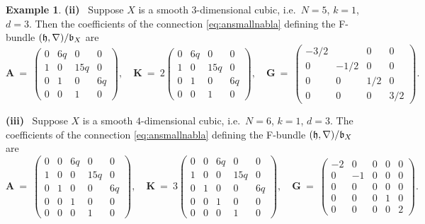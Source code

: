 \documentclass[twoside,leqno]{article}
\numberwithin{equation}{section}
\theoremstyle{plain}
\theoremstyle{definition}
\newtheorem{example}[equation]{Example}
\begin{document}
\begin{example}
\medskip

\noindent
{\bfseries (ii)} \  Suppose $X$ is a smooth  $3$-dimensional cubic, i.e.\ $N=5$, $k=1$, $d = 3$. Then the coefficients of the connection \eqref{eq:ansmallnabla} defining the F-bundle $(\mathfrak{h},\nabla)/\mathfrak{b}_{X}$ are
{\scriptsize
\[ 
\mathbf{A} \ = \  \begin{pmatrix}
0 & 6q & 0 & 0 \\
1 & 0 & 15q & 0 \\
0 & 1 & 0 & 6q \\
0 & 0 & 1 & 0
\end{pmatrix}, \quad 
\mathbf{K} \ = \  2\begin{pmatrix}
0 & 6q & 0 & 0 \\
1 & 0 & 15q & 0 \\
0 & 1 & 0 & 6q \\
0 & 0 & 1 & 0
\end{pmatrix}, \quad 
\mathbf{G} \ = \  \begin{pmatrix}
-3/2 &  & 0 & 0 \\
0 & -1/2 & 0 & 0 \\
0 & 0 & 1/2 & 0 \\
0 & 0 & 0 & 3/2
\end{pmatrix}.
\]
}


\medskip

\noindent
{\bfseries (iii)} \ Suppose $X$ is a smooth  $4$-dimensional cubic, i.e.\ $N=6$, $k=1$, $d = 3$. 
The coefficients of the connection \eqref{eq:ansmallnabla} defining the F-bundle $(\mathfrak{h},\nabla)/\mathfrak{b}_{X}$ are
{\scriptsize
\[
\mathbf{A} \ = \  \begin{pmatrix}
0 & 0 & 6q & 0 & 0 \\
1 & 0 & 0 & 15q & 0 \\
0 & 1 & 0 & 0 & 6q \\
0 & 0 & 1 & 0 & 0 \\
0 & 0 & 0 & 1 & 0
\end{pmatrix}, \quad 
\mathbf{K} \ = \  3\begin{pmatrix}
0 & 0 & 6q & 0 & 0 \\
1 & 0 & 0 & 15q & 0 \\
0 & 1 & 0 & 0 & 6q \\
0 & 0 & 1 & 0 & 0 \\
0 & 0 & 0 & 1 & 0
\end{pmatrix}, \quad 
\mathbf{G} \ = \  \begin{pmatrix}
-2 & 0 & 0 & 0  & 0 \\
0 & -1 & 0 &  0 & 0 \\
0 & 0 & 0 & 0  & 0 \\
0 & 0 & 0 & 1 & 0 \\
0 & 0 & 0 & 0 & 2
\end{pmatrix}.
\]
}
\end{example}
\end{document}
